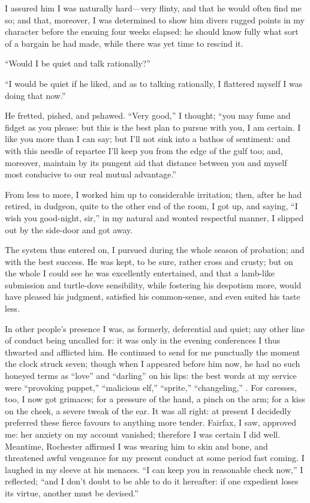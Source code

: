 I assured him I was naturally hard---very flinty, and that he would
often find me so; and that, moreover, I was determined to show him
divers rugged points in my character before the ensuing four weeks
elapsed: he should know fully what sort of a bargain he had made, while
there was yet time to rescind it.

\enquote{Would I be quiet and talk rationally?}

\enquote{I would be quiet if he liked, and as to talking rationally, I
flattered myself I was doing that now.}

He fretted, pished, and pshawed.  \enquote{Very good,} I thought;
\enquote{you may fume and fidget as you please: but this is the best
plan to pursue with you, I am certain.  I like you more than I can say;
but I'll not sink into a bathos of sentiment: and with this needle of
repartee I'll keep you from the edge of the gulf too; and, moreover,
maintain by its pungent aid that distance between you and myself most
conducive to our real mutual advantage.}

From less to more, I worked him up to considerable irritation; then,
after he had retired, in dudgeon, quite to the other end of the room, I
got up, and saying, \enquote{I wish you good-night, sir,} in my natural
and wonted respectful manner, I slipped out by the side-door and got
away.

The system thus entered on, I pursued during the whole season of
probation; and with the best success.  He was kept, to be sure, rather
cross and crusty; but on the whole I could see he was excellently
entertained, and that a lamb-like submission and turtle-dove
sensibility, while fostering his despotism more, would have pleased his
judgment, satisfied his common-sense, and even suited his taste less.

In other people's presence I was, as formerly, deferential and quiet;
any other line of conduct being uncalled for: it was only in the evening
conferences I thus thwarted and afflicted him.  He continued to send for
me punctually the moment the clock struck seven; though when I appeared
before him now, he had no such honeyed terms as \enquote{love} and
\enquote{darling} on his lips: the best words at my service were
\enquote{provoking puppet,} \enquote{malicious elf,} \enquote{sprite,}
\enquote{changeling,} \etc.  For caresses, too, I now got grimaces; for a
pressure of the hand, a pinch on the arm; for a kiss on the cheek, a
severe tweak of the ear.  It was all right: at present I decidedly
preferred these fierce favours to anything more tender.  \Mrs{} Fairfax, I
saw, approved me: her anxiety on my account vanished; therefore I was
certain I did well.  Meantime, \Mr{} Rochester affirmed I was wearing him
to skin and bone, and threatened awful vengeance for my present conduct
at some period fast coming.  I laughed in my sleeve at his menaces. 
\enquote{I can keep you in reasonable check now,} I reflected;
\enquote{and I don't doubt to be able to do it hereafter: if one
expedient loses its virtue, another must be devised.}

